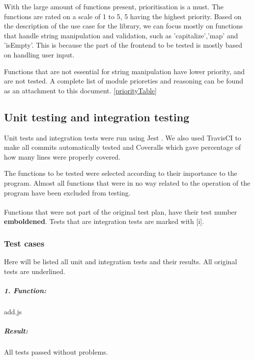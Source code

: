 \documentclass[a4paper, 12pt]{article}
\begin{document}
With the large amount of functions present, prioritisation is a must. The functions are rated on a scale of 1 to 5, 5 having the highest priority.
Based on the description of the use case for the library, we can focus mostly on functions that handle string manipulation and validation,
such as 'capitalize','map' and 'isEmpty'. This is because the part of the frontend to be tested  is mostly based on handling user input.

\vspace{5mm}

Functions that are not essential for string manipulation have lower priority, and are not tested.
A complete list of module prioreties and reasoning can be found as an attachment to this document. \ref{priorityTable}


    \subsection{Unit testing and integration testing}
    Unit tests and integration tests were run using Jest \cite{jest}. We also used TravisCI \cite{travis} to make all commits automatically tested and Coveralls \cite{coveralls} which gave percentage of how many lines were properly covered. 
    
    \vspace{5mm}
    
    The functions to be tested were selected according to their importance to the program. Almost all functions that were in no way related to the operation of the program have been excluded from testing. \\
    \\
    Functions that were not part of the original test plan, have their test number \textbf{emboldened}. Tests that are integration tests are marked with [i].
    \newpage

        \subsubsection{Test cases}
		Here will be listed all unit and integration tests and their results.
		All original tests are underlined. 

		\hypertarget{header-n5}{%
		\subparagraph{1. Function:}\label{header-n5}}

		add.js
		
		\hypertarget{header-n25}{%
		\subparagraph{Result:}\label{header-n25}}
		
		All tests passed without problems.
		
\end{document}
